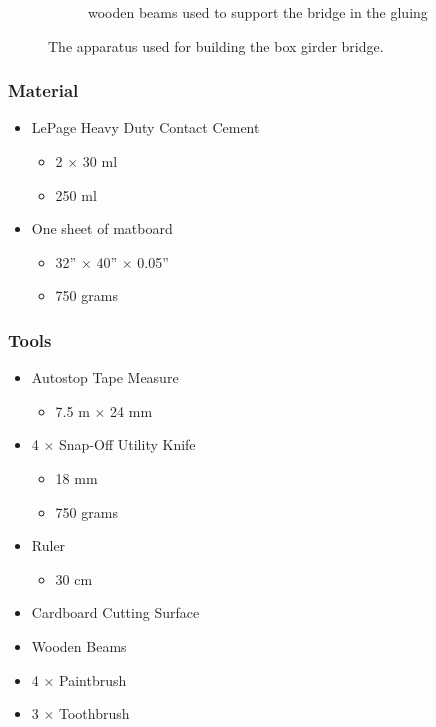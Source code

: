\documentclass[11pt]{article}
\begin{document}
\begin{figure}[h]
\begin{subfigure}[b]{.263\linewidth}
        \caption{\label{c2} wooden beams used to support the bridge in the gluing }
    \end{subfigure}
    \caption{The apparatus used for building the box girder bridge.}
\end{figure}

\begin{minipage}[t]{.5\linewidth}
    \subsubsection{Material}
    \begin{itemize}
        \item LePage Heavy Duty Contact Cement
              \begin{itemize}
                  \item 2 $\times$ 30 ml
                  \item 250 ml
              \end{itemize}
        \item One sheet of matboard
              \begin{itemize}
                  \item 32” $\times$ 40” $\times$ 0.05”
                  \item 750 grams
              \end{itemize}
    \end{itemize}
\end{minipage}
\begin{minipage}[t]{.5\linewidth}
    \subsubsection{Tools}
    \begin{itemize}
        \item Autostop Tape Measure
              \begin{itemize}
                  \item 7.5 m $\times$ 24 mm
              \end{itemize}
        \item 4 $\times$ Snap-Off Utility Knife
              \begin{itemize}
                  \item 18 mm
                  \item 750 grams
              \end{itemize}
        \item Ruler
              \begin{itemize}
                  \item 30 cm
              \end{itemize}
        \item Cardboard Cutting Surface
        \item	Wooden Beams
        \item	4 $\times$ Paintbrush
        \item	3 $\times$ Toothbrush
    \end{itemize}
\end{minipage}
\end{document}
